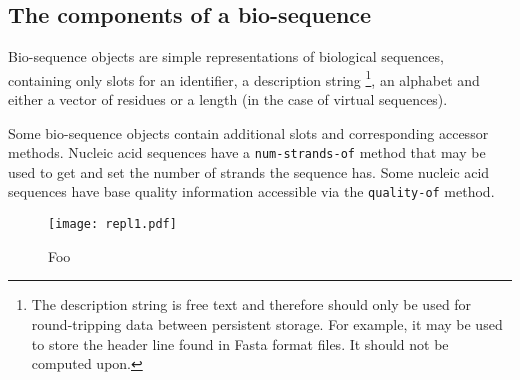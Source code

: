 \documentclass[a4paper, 12pt]{article}
\begin{document}
\subsection{The components of a bio-sequence}
\label{sec:component-bioseq}

Bio-sequence objects are simple representations of biological
sequences, containing only slots for an identifier, a description
string \footnote{The description string is free text and therefore
  should only be used for round-tripping data between persistent
  storage. For example, it may be used to store the header line found
  in Fasta format files. It should not be computed upon.}, an alphabet
and either a vector of residues or a length (in the case of virtual
sequences).

Some bio-sequence objects contain additional slots and corresponding
accessor methods. Nucleic acid sequences have a
\lstinline!num-strands-of! method that may be used to get and set the
number of strands the sequence has. Some nucleic acid sequences have
base quality information accessible via the \lstinline!quality-of!
method.





\begin{figure}[1]
  \texttt{[image: repl1.pdf]}
  \caption{Foo}
  \label{fig:repl1}
\end{figure}
\end{document}
